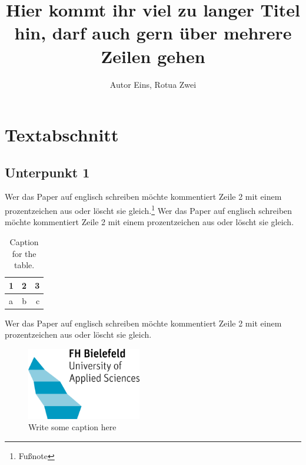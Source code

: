 \documentclass[12pt,twocolumn,twoside]{conference}
\title{Hier kommt ihr viel zu langer Titel hin, darf auch gern über mehrere Zeilen gehen}
\author{Autor Eins, Rotua Zwei}
\begin{document}
\section{Textabschnitt}
\subsection{Unterpunkt 1}
Wer das Paper auf englisch schreiben möchte kommentiert Zeile 2 mit einem prozentzeichen aus oder löscht sie gleich.\footnote{Fußnote} Wer das Paper auf englisch schreiben möchte kommentiert Zeile 2 mit einem prozentzeichen aus oder löscht sie gleich.

\begin{table}[!h]
  \centering 
  \label{tab:table1}
  \begin{tabular}{l|c||r}
    1 & 2 & 3\\
    \hline
    a & b & c\\
  \end{tabular}
  \caption{Caption for the table.}
\end{table}

Wer das Paper auf englisch schreiben möchte kommentiert Zeile 2 mit einem prozentzeichen aus oder löscht sie gleich.

\begin{figure}[H]
\centering
\includegraphics[width=5cm]{fhbielefeld_logo.png}
\caption{Write some caption here}\label{visina8}
\vspace{-12pt}
\end{figure}
\end{document}
